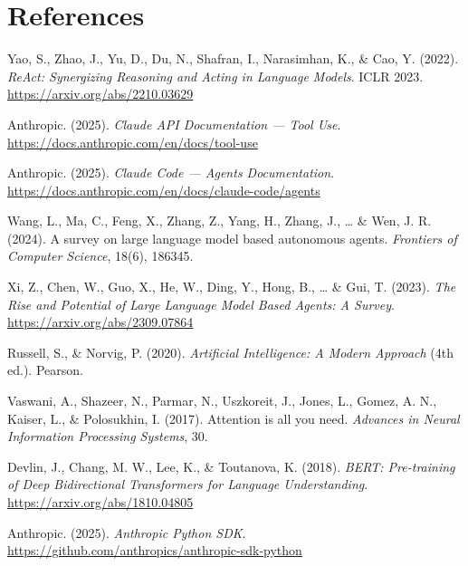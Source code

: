 \documentclass[11pt,letterpaper]{article}
\begin{document}
\section*{References}

\begin{enumerate}[leftmargin=*, label={[\arabic*]}]
    \item Yao, S., Zhao, J., Yu, D., Du, N., Shafran, I., Narasimhan, K., \& Cao, Y. (2022). \textit{ReAct: Synergizing Reasoning and Acting in Language Models}. ICLR 2023. \url{https://arxiv.org/abs/2210.03629}

    \item Anthropic. (2025). \textit{Claude API Documentation --- Tool Use}. \url{https://docs.anthropic.com/en/docs/tool-use}

    \item Anthropic. (2025). \textit{Claude Code --- Agents Documentation}. \url{https://docs.anthropic.com/en/docs/claude-code/agents}

    \item Wang, L., Ma, C., Feng, X., Zhang, Z., Yang, H., Zhang, J., \ldots{} \& Wen, J. R. (2024). A survey on large language model based autonomous agents. \textit{Frontiers of Computer Science}, 18(6), 186345.

    \item Xi, Z., Chen, W., Guo, X., He, W., Ding, Y., Hong, B., \ldots{} \& Gui, T. (2023). \textit{The Rise and Potential of Large Language Model Based Agents: A Survey}. \url{https://arxiv.org/abs/2309.07864}

    \item Russell, S., \& Norvig, P. (2020). \textit{Artificial Intelligence: A Modern Approach} (4th ed.). Pearson.

    \item Vaswani, A., Shazeer, N., Parmar, N., Uszkoreit, J., Jones, L., Gomez, A. N., Kaiser, L., \& Polosukhin, I. (2017). Attention is all you need. \textit{Advances in Neural Information Processing Systems}, 30.

    \item Devlin, J., Chang, M. W., Lee, K., \& Toutanova, K. (2018). \textit{BERT: Pre-training of Deep Bidirectional Transformers for Language Understanding}. \url{https://arxiv.org/abs/1810.04805}

    \item Anthropic. (2025). \textit{Anthropic Python SDK}. \url{https://github.com/anthropics/anthropic-sdk-python}
\end{enumerate}

\end{document}
